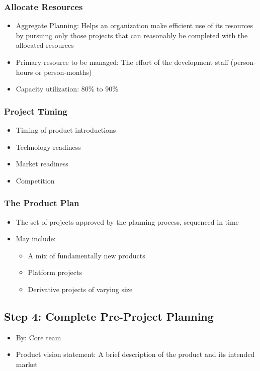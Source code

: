 \documentclass[openany,12pt,a4paper]{book}
\begin{document}
\subsubsection{Allocate Resources}
\begin{itemize}
    \item Aggregate Planning: Helps an organization make efficient use of its resources by pursuing only those projects that can reasonably be completed with the allocated resources
    \item Primary resource to be managed: The effort of the development staff (person-hours or person-months)
    \item Capacity utilization: 80\% to 90\%
\end{itemize}
\subsubsection{Project Timing}
\begin{itemize}
    \item Timing of product introductions
    \item Technology readiness
    \item Market readiness
    \item Competition
\end{itemize}
\subsubsection{The Product Plan}
\begin{itemize}
    \item The set of projects approved by the planning process, sequenced in time
    \item May include:
    \begin{itemize}
        \item A mix of fundamentally new products
        \item Platform projects
        \item Derivative projects of varying size
    \end{itemize}
\end{itemize}
\subsection{Step 4: Complete Pre-Project Planning}
\begin{itemize}
    \item By: Core team
    \item Product vision statement: A brief description of the product and its intended market
\end{itemize}
\end{document}
